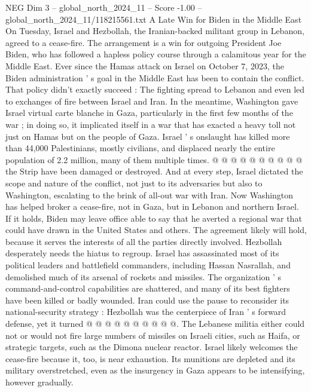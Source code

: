 \begin{textsample}{NEG Dim 3 – global\_north\_2024\_11 – Score -1.00 – global\_north\_2024\_11/118215561.txt}  \label{ex:f3_neg_281}
A Late Win for Biden in the Middle East On Tuesday, Israel and Hezbollah, the Iranian-backed militant group in Lebanon, agreed to a cease-fire.
The arrangement is a win for outgoing President Joe Biden, who has followed a hapless policy course through a calamitous year for the Middle East.
Ever since the Hamas attack on Israel on October 7, 2023, the Biden administration ' s goal in the Middle East has been to contain the conflict.
That policy didn't exactly succeed : The fighting spread to Lebanon and even led to exchanges of fire between Israel and Iran.
In the meantime, Washington gave Israel virtual carte blanche in Gaza, particularly in the first few months of the war ; in doing so, it implicated itself in a war that has exacted a heavy toll not just on Hamas but on the people of Gaza.
Israel ' s onslaught has killed more than 44,000 Palestinians, mostly civilians, and displaced nearly the entire population of 2.2 million, many of them multiple times. @ @ @ @ @ @ @ @ @ @ the Strip have been damaged or destroyed.
And at every step, Israel dictated the scope and nature of the conflict, not just to its adversaries but also to Washington, escalating to the brink of all-out war with Iran.
Now Washington has helped broker a cease-fire, not in Gaza, but in Lebanon and northern Israel.
If it holds, Biden may leave office able to say that he averted a regional war that could have drawn in the United States and others.
The agreement likely will hold, because it serves the interests of all the parties directly involved.
Hezbollah desperately needs the hiatus to regroup.
Israel has assassinated most of its political leaders and battlefield commanders, including Hassan Nasrallah, and demolished much of its arsenal of rockets and missiles.
The organization ' s command-and-control capabilities are shattered, and many of its best fighters have been killed or badly wounded.
Iran could use the pause to reconsider its national-security strategy : Hezbollah was the centerpiece of Iran ' s forward defense, yet it turned @ @ @ @ @ @ @ @ @ @.
The Lebanese militia either could not or would not fire large numbers of missiles on Israeli cities, such as Haifa, or strategic targets, such as the Dimona nuclear reactor.
Israel likely welcomes the cease-fire because it, too, is near exhaustion.
Its munitions are depleted and its military overstretched, even as the insurgency in Gaza appears to be intensifying, however gradually.

\end{textsample}
